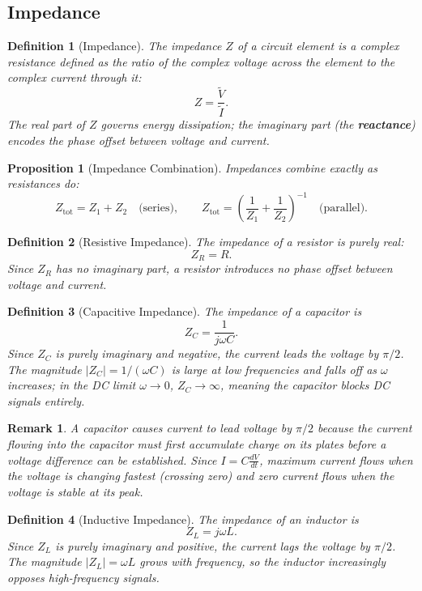 \documentclass{article}
\newtheorem{definition}{Definition}
\newtheorem{remark}{Remark}
\newtheorem{proposition}{Proposition}
\begin{document}
\subsection{Impedance}
\begin{definition}[Impedance]
    The impedance $Z$ of a circuit element is a complex resistance defined as the ratio of the complex voltage across the element to the complex current through it:
    \[Z = \frac{\tilde{V}}{\tilde{I}}.\]
    The real part of $Z$ governs energy dissipation; the imaginary part (the \textbf{reactance}) encodes the phase offset between voltage and current.
\end{definition}
\begin{proposition}[Impedance Combination]
    Impedances combine exactly as resistances do:
    \[Z_{\text{tot}} = Z_1 + Z_2 \quad \text{(series)}, \qquad Z_{\text{tot}} = \left(\frac{1}{Z_1} + \frac{1}{Z_2}\right)^{-1} \quad \text{(parallel)}.\]
\end{proposition}
\begin{definition}[Resistive Impedance]
    The impedance of a resistor is purely real:
    \[Z_R = R.\]
    Since $Z_R$ has no imaginary part, a resistor introduces no phase offset between voltage and current.
\end{definition}
\begin{definition}[Capacitive Impedance]
    The impedance of a capacitor is
    \[Z_C = \frac{1}{j\omega C}.\]
    Since $Z_C$ is purely imaginary and negative, the current leads the voltage by $\pi/2$. The magnitude $|Z_C| = 1/(\omega C)$ is large at low frequencies and falls off as $\omega$ increases; in the DC limit $\omega \to 0$, $Z_C \to \infty$, meaning the capacitor blocks DC signals entirely.
\end{definition}
\begin{remark}
    A capacitor causes current to lead voltage by $\pi/2$ because the current flowing into the capacitor must first accumulate charge on its plates before a voltage difference can be established. Since $I = C\frac{dV}{dt}$, maximum current flows when the voltage is changing fastest (crossing zero) and zero current flows when the voltage is stable at its peak.
\end{remark}
\begin{definition}[Inductive Impedance]
    The impedance of an inductor is
    \[Z_L = j\omega L.\]
    Since $Z_L$ is purely imaginary and positive, the current lags the voltage by $\pi/2$. The magnitude $|Z_L| = \omega L$ grows with frequency, so the inductor increasingly opposes high-frequency signals.
\end{definition}
\end{document}
